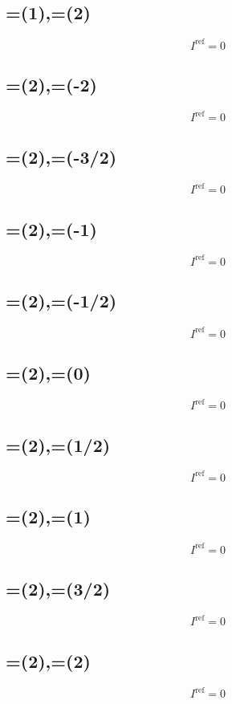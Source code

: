\documentclass[11pt,a4paper]{article}
\newcommand{\Iref}{I^{\mathrm{ref}}}
\begin{document}
\subsection{=(1),\;=(2)}
\[ \Iref = 0 \]

\subsection{=(2),\;=(-2)}
\[ \Iref = 0 \]

\subsection{=(2),\;=(-3/2)}
\[ \Iref = 0 \]

\subsection{=(2),\;=(-1)}
\[ \Iref = 0 \]

\subsection{=(2),\;=(-1/2)}
\[ \Iref = 0 \]

\subsection{=(2),\;=(0)}
\[ \Iref = 0 \]

\subsection{=(2),\;=(1/2)}
\[ \Iref = 0 \]

\subsection{=(2),\;=(1)}
\[ \Iref = 0 \]

\subsection{=(2),\;=(3/2)}
\[ \Iref = 0 \]

\subsection{=(2),\;=(2)}
\[ \Iref = 0 \]
\end{document}
